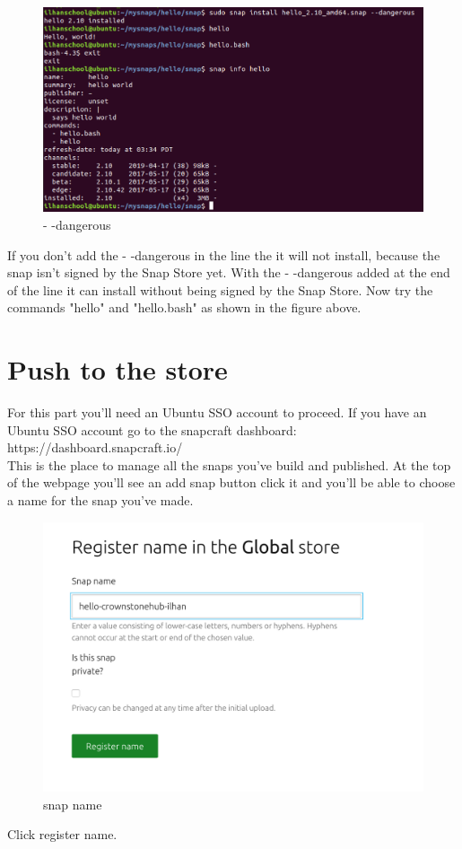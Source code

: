\documentclass{article}
\begin{document}
\begin{flushleft}
\begin{flushleft}
\label{fig:step12}	
	\begin{figure}[H]
	\includegraphics[width=5in]{step12.png}
	\caption[Optional caption]{- -dangerous}
	\end{figure}
If you don't add the - -dangerous in the line the it will not install, because the snap isn't signed by the Snap Store yet. With the - -dangerous added at the end of the line it can install without being signed by the Snap Store. Now try  the commands "hello" and "hello.bash" as shown in the figure above. 
\cleardoublepage
%
%
%
%
%
\section{Push to the store}\label{sec:push2store}
For this part you'll need an Ubuntu SSO account to proceed. If you have an Ubuntu SSO account go to the snapcraft dashboard: {https://dashboard.snapcraft.io/}\\
This is the place to manage all the snaps you've build and published.
At the top of the webpage you'll see an add snap button click it and you'll be able to choose a name for the snap you've made. 
\label{fig:step19}	
	\begin{figure}[H]
	\includegraphics[width=5in]{step19.png}
	\caption[Optional caption]{snap name}
	\end{figure}
Click register name.


\end{flushleft}
\end{flushleft}
\end{document}
